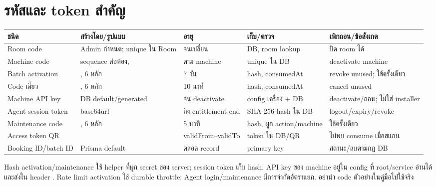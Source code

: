 \chapter{รหัสและ token สำคัญ}
\begin{longtable}{L{27mm}L{32mm}L{32mm}L{32mm}L{34mm}}
\toprule ชนิด & สร้างโดย/รูปแบบ & อายุ & เก็บ/ตรวจ & เพิกถอน/ข้อสังเกต \\ \midrule\endhead
Room code & Admin กำหนด; unique ใน Room & จนเปลี่ยน & DB, room lookup & ปิด room ได้ \\
Machine code & sequence ต่อห้อง,  & ตาม machine & unique ใน DB & deactivate machine \\
Batch activation & , 6 หลัก & 7 วัน & hash, consumedAt & revoke unused; ใช้ครั้งเดียว \\
Code เดี่ยว & , 6 หลัก & 10 นาที & hash, consumedAt & cancel unused \\
Machine API key & DB default/generated & จน deactivate & config เครื่อง + DB & deactivate/ถอน; ไม่ใส่ installer \\
Agent session token &  base64url & ถึง entitlement end & SHA-256 hash ใน DB & logout/expiry/revoke \\
Maintenance code & , 6 หลัก & 5 นาที & hash, ผูก action/machine & ใช้ครั้งเดียว \\
Access token QR & \newline{} & validFrom--validTo & token ใน DB/QR & ไม่พบ consume เมื่อสแกน \\
Booking ID/batch ID & Prisma default  & ตลอด record & primary key & สถานะ/ลบตามกฎ DB \\
\bottomrule
\end{longtable}
Hash activation/maintenance ใช้ helper  ที่ผูก secret ของ server; session token เก็บ hash. API key ของ machine อยู่ใน config ที่ root/service อ่านได้และส่งใน header . Rate limit activation ใช้ durable throttle; Agent login/maintenance มีการจำกัดอัตราแยก. อย่านำ code ตัวอย่างในคู่มือไปใช้จริง

